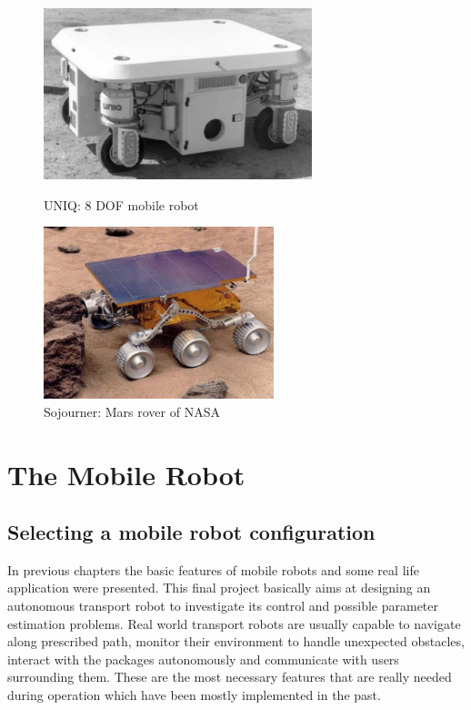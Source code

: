 \documentclass[12pt,english]{article}
\begin{document}
\begin{figure}[htb!]
	\centering
	\centering
	\includegraphics[height=5cm]{figures/uniq.png}
	\caption{UNIQ: 8 DOF mobile robot}
	\endminipage\hfill
	\centering
	\includegraphics[height=5cm]{figures/rover.png}
	\caption{Sojourner: Mars rover of NASA}
	\label{mecanum}
	\endminipage\hfill
\end{figure}

\newpage
\section{The Mobile Robot}
\subsection{Selecting a mobile robot configuration}
In previous chapters the basic features of mobile robots and some real life application were presented. This final project basically aims at designing an autonomous transport robot to investigate its control and possible parameter estimation problems. Real world transport robots are usually capable to navigate along prescribed path, monitor their environment to handle unexpected obstacles, interact with the packages autonomously and communicate with users surrounding them. These are the most necessary features that are really needed during operation which have been mostly implemented in the past.
\end{document}

